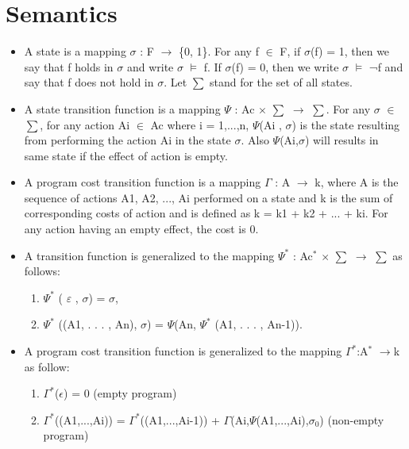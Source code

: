\documentclass[11pt]{article}
\begin{document}
	\section{Semantics}
	\begin{itemize}
\item 	A state is a mapping $\sigma$ : F $\rightarrow$ \{0, 1\}. For any f $\in$ F, if $\sigma$(f) = 1, then we say that f holds in $\sigma$ and write $\sigma$   $\vDash$   f. If $\sigma$(f) = 0, then we write $\sigma$   $\vDash$   ¬f and say that f does not hold in $\sigma$. Let $\sum$ stand for the set of all states.

\item 	A state transition function is a mapping $\Psi$ : Ac $\times$ $\sum$ $\rightarrow$ $\sum$. For any $\sigma$ $\in$ $\sum$, for any action Ai $\in$ Ac where i = 1,...,n, $\Psi$(Ai , $\sigma$) is the state resulting from performing the action Ai in the state $\sigma$. Also $\Psi$(Ai,$\sigma$) will results in same state if the effect of action is empty.

\item A program cost transition function is a mapping $\Gamma$ : A $\rightarrow$ k, where A is the sequence of actions A1, A2, ..., Ai performed on a state and k is the sum of corresponding costs of action and is defined as k = k1 + k2 + ... + ki. For any action having an empty effect, the cost is 0.

\item 	A transition function is generalized to the mapping $\Psi^{\ast}$ : Ac$^{\ast}$  $\times$  $\sum$ $\rightarrow$ $\sum$ as follows: 
\begin{enumerate}

\item $\Psi^{\ast}$ ( $\varepsilon$ , $\sigma$) = $\sigma$,
 
\item $\Psi^{\ast}$ ((A1, . . . , An), $\sigma$) = $\Psi$(An, $\Psi^{\ast}$ (A1, . . . , An-1)). 

\end{enumerate}

\item A program cost transition function is generalized to the mapping $\Gamma^{\ast}$:A$^{\ast}$ $\rightarrow$k as follow:
\begin{enumerate}
\item $\Gamma^{\ast}$($\epsilon$) = 0 (empty program)
\item $\Gamma^{\ast}$((A1,...,Ai)) = $\Gamma^{\ast}$((A1,...,Ai-1)) + $\Gamma$(Ai,$\Psi$(A1,...,Ai),$\sigma_{0}$) (non-empty program)
\end{enumerate}


\end{itemize}
\end{document}
